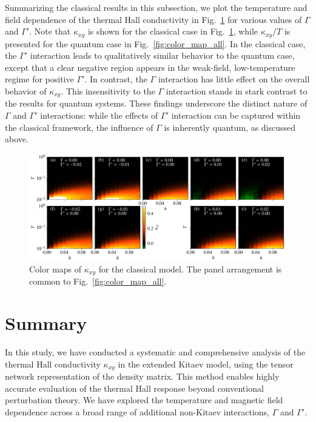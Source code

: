 \documentclass[twocolumn,superscriptaddress,showpacs, longbibliography, aps, prx]{revtex4-2}
\begin{document}
Summarizing the classical results in this subsection, we plot the temperature and field dependence of the thermal Hall conductivity in Fig.~\ref{fig:cmap_classical} for various values of $\Gamma$ and $\Gamma'$.
Note that $\kappa_{xy}$ is shown for the classical case in Fig.~\ref{fig:cmap_classical}, while $\kappa_{xy}/T$ is presented for the quantum case in Fig.~\ref{fig:color_map_all}.
In the classical case, the $\Gamma'$ interaction leads to qualitatively similar behavior to the quantum case, except that a clear negative region appears in the weak-field, low-temperature regime for positive $\Gamma'$. 
In contrast, the $\Gamma$ interaction has little effect on the overall behavior of $\kappa_{xy}$.
This insensitivity to the $\Gamma$ interaction stands in stark contrast to the results for quantum systems.
These findings underscore the distinct nature of $\Gamma$ and $\Gamma'$ interactions: 
while the effects of $\Gamma'$ interaction can be captured within the classical framework, the influence of $\Gamma$ is inherently quantum, as discussed above. 

\begin{figure}[tbh]
  \begin{center}
    \includegraphics[width=\linewidth]{Data_for_figs/plot/fig-17-classical-cmap.pdf}
  \end{center}
  \caption{
Color maps of $\kappa_{xy}$ for the classical model. The panel arrangement is common to Fig.~\ref{fig:color_map_all}.
  }
  \label{fig:cmap_classical}
\end{figure}

\section{Summary}
\label{sec:Summary}
In this study, we have conducted a systematic and comprehensive analysis of the thermal Hall conductivity $\kappa_{xy}$ in the extended Kitaev model, using the tensor network representation of the density matrix. 
This method enables highly accurate evaluation of the thermal Hall response beyond conventional perturbation theory. 
We have explored the temperature and magnetic field dependence across a broad range of additional non-Kitaev interactions, $\Gamma$ and $\Gamma'$. 
\end{document}
